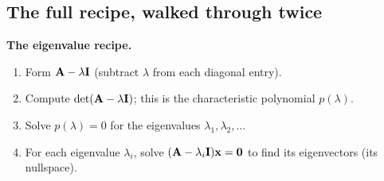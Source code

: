\subsection{The full recipe, walked through twice}
\label{ch23:recipe}

\begin{focusbox}
\textbf{The eigenvalue recipe.}
\begin{enumerate}
  \item Form $\mathbf{A}-\lambda\mathbf{I}$ (subtract $\lambda$ from each diagonal entry).
  \item Compute $\det(\mathbf{A}-\lambda\mathbf{I})$; this is the characteristic
        polynomial $p(\lambda)$.
  \item Solve $p(\lambda)=0$ for the eigenvalues $\lambda_1,\lambda_2,\dots$
  \item For each eigenvalue $\lambda_i$, solve $(\mathbf{A}-\lambda_i\mathbf{I})\mathbf{x}=\mathbf{0}$
        to find its eigenvectors (its nullspace).
\end{enumerate}
\end{focusbox}

